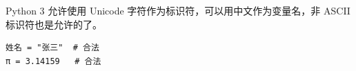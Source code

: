 Python 3 允许使用 Unicode 字符作为标识符，可以用中文作为变量名，非 ASCII 标识符也是允许的了。
\begin{lstlisting}[style=demostyle,numbers=none]
姓名 = "张三"  # 合法
π = 3.14159   # 合法
\end{lstlisting}























